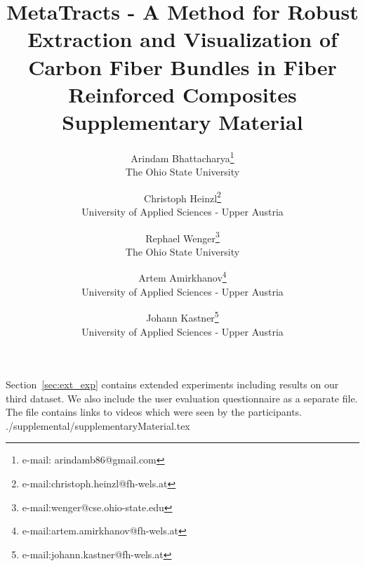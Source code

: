 \documentclass[10pt,a4paper]{article}
\begin{document}
	\title{MetaTracts - A Method for Robust Extraction and Visualization of Carbon Fiber Bundles in Fiber Reinforced Composites \\
		Supplementary Material}
	\author{Arindam Bhattacharya\thanks{e-mail: arindamb86@gmail.com}\\ %
		\scriptsize The Ohio State University %
		\and Christoph Heinzl\thanks{e-mail:christoph.heinzl@fh-wels.at}\\ %
		\scriptsize University of Applied Sciences - Upper Austria%
		\and Rephael Wenger\thanks{e-mail:wenger@cse.ohio-state.edu}\\ %
		\scriptsize The Ohio State University
		\and Artem Amirkhanov\thanks{e-mail:artem.amirkhanov@fh-wels.at}\\ %
		\scriptsize University of Applied Sciences - Upper Austria%
		\and Johann Kastner\thanks{e-mail:johann.kastner@fh-wels.at}\\ %
		\scriptsize University of Applied Sciences - Upper Austria%
		}
	\maketitle
Section~\ref{sec:ext_exp} contains extended experiments including results on our third dataset.
We also include the user evaluation  questionnaire as a separate file. The file contains links to videos which were seen by the participants. 
 {./supplemental/supplementaryMaterial.tex}
\end{document}
